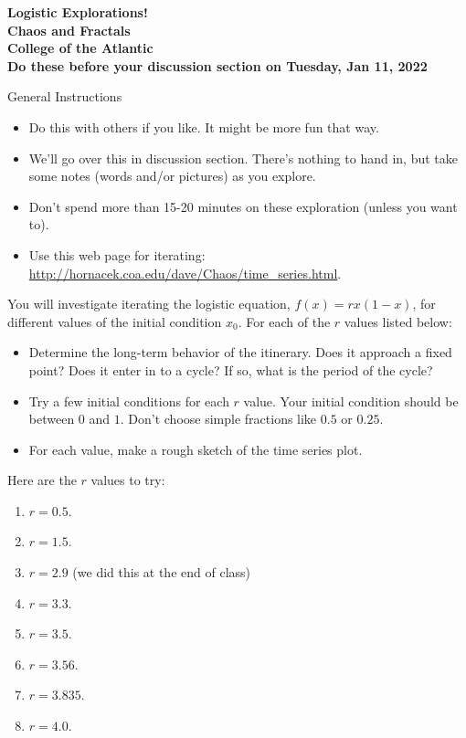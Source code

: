 \documentclass[12pt]{article}
\begin{document}
\pagestyle{empty}
 
\begin{center}
{\LARGE {\bf Logistic Explorations!}}\\
\bigskip
{\Large {\bf Chaos and Fractals}}\\
\bigskip
{\Large {\bf College of the Atlantic}}\\
\bigskip
    {{\bf Do these before your discussion section on Tuesday, Jan 11,
        2022}}\\   
\end{center}
\medskip

\noindent General Instructions

\begin{itemize}
\setlength{\itemsep}{0mm}
\item Do this with others if you like. It might be more fun that
  way.
\item We'll go over this in discussion section. There's nothing to
  hand in, but take some notes (words and/or pictures) as you
  explore.
\item Don't spend more than 15-20 minutes on these exploration (unless
  you want to).
  \item Use this web page for iterating:
\href{http://hornacek.coa.edu/dave/Chaos/time_series.html}{\url{http://hornacek.coa.edu/dave/Chaos/time_series.html}}.
\end{itemize}


\noindent You will investigate iterating the logistic equation, $f(x)
= rx(1-x)$, for different values of the initial condition $x_0$.  For
each of the $r$ values listed below:
\begin{itemize}
  \setlength{\itemsep}{0mm}
  \item Determine the long-term behavior of the itinerary. Does it
    approach a fixed point?  Does it enter in to a cycle?  If so, what
    is the period of the cycle?
  \item Try a few initial conditions for each $r$ value.  Your initial
    condition should be between $0$ and $1$.  Don't choose simple
    fractions like $0.5$ or $0.25$.
  \item For each value, make a rough sketch of the time series plot.\\
\end{itemize}


\noindent Here are the $r$ values to try:
\begin{enumerate}
\item $r=0.5$.
\item $r=1.5$.
\item $r=2.9$ (we did this at the end of class)
\item $r=3.3$.
\item $r=3.5$.
\item $r=3.56$.
\item $r=3.835$.
\item $r=4.0$.
\end{enumerate}
\end{document}
